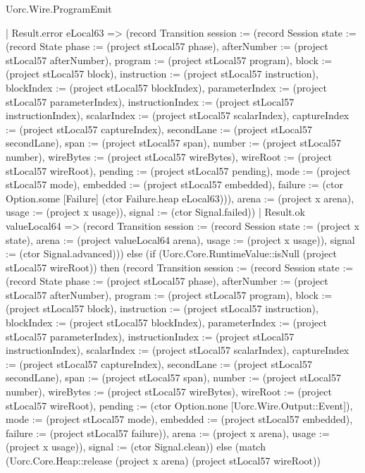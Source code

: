 \begin{lexlean}{Uorc.Wire.ProgramEmit}
\begin{semanticmodule}
{      | Result.error eLocal63 => (record Transition {session := (record Session {state := (record State {phase := (project stLocal57 phase), afterNumber := (project stLocal57 afterNumber), program := (project stLocal57 program), block := (project stLocal57 block), instruction := (project stLocal57 instruction), blockIndex := (project stLocal57 blockIndex), parameterIndex := (project stLocal57 parameterIndex), instructionIndex := (project stLocal57 instructionIndex), scalarIndex := (project stLocal57 scalarIndex), captureIndex := (project stLocal57 captureIndex), secondLane := (project stLocal57 secondLane), span := (project stLocal57 span), number := (project stLocal57 number), wireBytes := (project stLocal57 wireBytes), wireRoot := (project stLocal57 wireRoot), pending := (project stLocal57 pending), mode := (project stLocal57 mode), embedded := (project stLocal57 embedded), failure := (ctor Option.some [Failure] (ctor Failure.heap eLocal63))}), arena := (project x arena), usage := (project x usage)}), signal := (ctor Signal.failed)})
      | Result.ok valueLocal64 => (record Transition {session := (record Session {state := (project x state), arena := (project valueLocal64 arena), usage := (project x usage)}), signal := (ctor Signal.advanced)})) else (if (Uorc.Core.RuntimeValue::isNull (project stLocal57 wireRoot)) then (record Transition {session := (record Session {state := (record State {phase := (project stLocal57 phase), afterNumber := (project stLocal57 afterNumber), program := (project stLocal57 program), block := (project stLocal57 block), instruction := (project stLocal57 instruction), blockIndex := (project stLocal57 blockIndex), parameterIndex := (project stLocal57 parameterIndex), instructionIndex := (project stLocal57 instructionIndex), scalarIndex := (project stLocal57 scalarIndex), captureIndex := (project stLocal57 captureIndex), secondLane := (project stLocal57 secondLane), span := (project stLocal57 span), number := (project stLocal57 number), wireBytes := (project stLocal57 wireBytes), wireRoot := (project stLocal57 wireRoot), pending := (ctor Option.none [Uorc.Wire.Output::Event]), mode := (project stLocal57 mode), embedded := (project stLocal57 embedded), failure := (project stLocal57 failure)}), arena := (project x arena), usage := (project x usage)}), signal := (ctor Signal.clean)}) else (match (Uorc.Core.Heap::release (project x arena) (project stLocal57 wireRoot))
}
\end{semanticmodule}
\end{lexlean}
